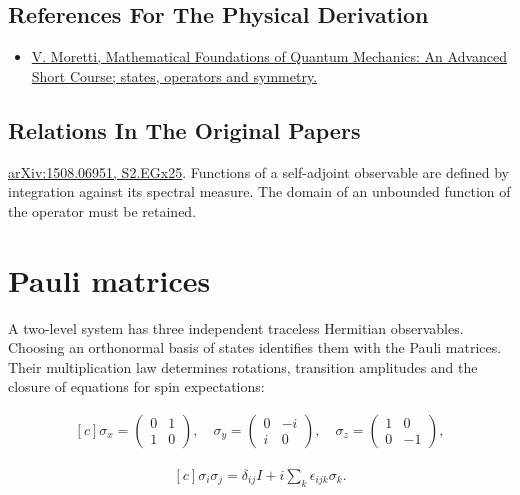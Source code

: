 \documentclass[11pt,oneside]{book}
\newenvironment{centeredalign}{\[\begin{gathered}[c]}{\end{gathered}\]}
\begin{document}
\subsection*{References For The Physical Derivation}
\begin{itemize}
\item \href{https://arxiv.org/abs/1508.06951}{V. Moretti, Mathematical Foundations of Quantum Mechanics: An Advanced Short Course; states, operators and symmetry.}
\end{itemize}

\subsection*{Relations In The Original Papers}

\href{https://arxiv.org/html/1508.06951#S2.EGx25}{arXiv:1508.06951, S2.EGx25}. Functions of a self-adjoint observable are defined by integration against its spectral measure. The domain of an unbounded function of the operator must be retained.



\clearpage

\section{Pauli matrices}

\label{topic:pauli-matrices}

A two-level system has three independent traceless Hermitian observables. Choosing an orthonormal basis of states identifies them with the Pauli matrices. Their multiplication law determines rotations, transition amplitudes and the closure of equations for spin expectations:

\begin{centeredalign}
\sigma_x=\begin{pmatrix}0&1\\1&0\end{pmatrix},\quad
\sigma_y=\begin{pmatrix}0&-i\\i&0\end{pmatrix},\quad
\sigma_z=\begin{pmatrix}1&0\\0&-1\end{pmatrix},
\end{centeredalign}

\begin{centeredalign}
\sigma_i\sigma_j=\delta_{ij}I+i\sum_k\epsilon_{ijk}\sigma_k.
\end{centeredalign}
\end{document}
